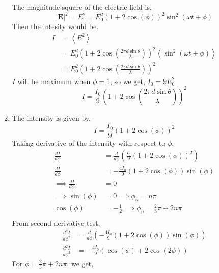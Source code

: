 \documentclass{article}
\theoremstyle{mytheoremstyle}
\theoremstyle{mytheoremstyle}
\theoremstyle{myproblemstyle}
\begin{document}
\begin{problem}[Intensity]
\begin{enumerate}
	      The magnitude square of the electric field is,
	      \[|\mathbf{E}|^2=E^2=E^2_0\left(1+2\cos{\left(\phi\right)}\right)^2\sin^2{\left(\omega t+\phi\right)}\]
	      Then the intesity would be.
	      \begin{align*}
		      I & = \left<E^2\right>                                                                                                            \\
		        & = E^2_0\left(1+2\cos{\left(\frac{2\pi d\sin{\theta}}{\lambda}\right)}\right)^2\left<\sin^2{\left(\omega t+\phi\right)}\right> \\
		        & = E^2_0\left(1+2\cos{\left(\frac{2\pi d\sin{\theta}}{\lambda}\right)}\right)^2
	      \end{align*}
	      \(I\) will be maximum when \(\phi=1\), so we get, \(I_0 = 9E^2_0\)
	      \[I = \frac{I_0}{9}\left(1+2\cos{\left(\frac{2\pi d\sin{\theta}}{\lambda}\right)}\right)^2\]
	\item The intensity is given by,
	      \[I = \frac{I_0}{9}\left(1+2\cos{\left(\phi\right)}\right)^2\]
	      Taking derivative of the intensity with respect to \(\phi\),
	      \begin{align*}
		      \frac{dI}{d\phi}                 & = \frac{d}{d\phi}\left(\frac{I_0}{9}\left(1+2\cos{\left(\phi\right)}\right)^2\right) \\
		      \frac{dI}{d\phi}                 & = -\frac{4I_0}{9}(1+2\cos{\left(\phi\right)})\sin{\left(\phi\right)}                 \\
		      \implies \frac{dI}{d\phi}        & = 0                                                                                  \\
		      \implies \sin{\left(\phi\right)} & = 0 \implies \phi_n = n\pi                                                           \\
		      \cos{\left(\phi\right)}          & = -\frac{1}{2} \implies \phi_n=\frac{2}{3}\pi+2n\pi                                  \\
	      \end{align*}
	      From second derivative test,
	      \begin{align*}
		      \frac{d^2I}{d\phi^2} & = \frac{d}{d\phi}\left(-\frac{4I_0}{9}(1+2\cos{\left(\phi\right)})\sin{\left(\phi\right)}\right) \\
		      \frac{d^2I}{d\phi^2} & = -\frac{4I_0}{9}\left(\cos{(\phi)}+2\cos{(2\phi)}\right)
	      \end{align*}
	      For \(\phi=\frac{2}{3}\pi+2n\pi\), we get,

\end{enumerate}
\end{problem}
\end{document}
